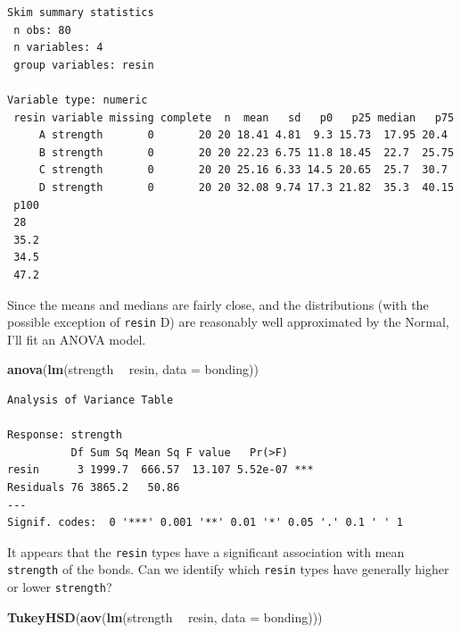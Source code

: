 \documentclass[]{book}
\newenvironment{Shaded}{\begin{snugshade}}{\end{snugshade}}
\newcommand{\KeywordTok}[1]{\textcolor[rgb]{0.13,0.29,0.53}{\textbf{#1}}}
\newcommand{\DataTypeTok}[1]{\textcolor[rgb]{0.13,0.29,0.53}{#1}}
\newcommand{\StringTok}[1]{\textcolor[rgb]{0.31,0.60,0.02}{#1}}
\newcommand{\OperatorTok}[1]{\textcolor[rgb]{0.81,0.36,0.00}{\textbf{#1}}}
\newcommand{\NormalTok}[1]{#1}
\theoremstyle{definition}
\theoremstyle{definition}
\theoremstyle{definition}
\theoremstyle{remark}
\begin{document}
\begin{Shaded}
\end{Shaded}

\begin{verbatim}
Skim summary statistics
 n obs: 80 
 n variables: 4 
 group variables: resin 

Variable type: numeric 
 resin variable missing complete  n  mean   sd   p0   p25 median   p75
     A strength       0       20 20 18.41 4.81  9.3 15.73  17.95 20.4 
     B strength       0       20 20 22.23 6.75 11.8 18.45  22.7  25.75
     C strength       0       20 20 25.16 6.33 14.5 20.65  25.7  30.7 
     D strength       0       20 20 32.08 9.74 17.3 21.82  35.3  40.15
 p100
 28  
 35.2
 34.5
 47.2
\end{verbatim}

Since the means and medians are fairly close, and the distributions
(with the possible exception of \texttt{resin} D) are reasonably well
approximated by the Normal, I'll fit an ANOVA model.

\begin{Shaded}
\begin{Highlighting}[]
\KeywordTok{anova}\NormalTok{(}\KeywordTok{lm}\NormalTok{(strength }\OperatorTok{~}\StringTok{ }\NormalTok{resin, }\DataTypeTok{data =}\NormalTok{ bonding))}
\end{Highlighting}
\end{Shaded}

\begin{verbatim}
Analysis of Variance Table

Response: strength
          Df Sum Sq Mean Sq F value   Pr(>F)    
resin      3 1999.7  666.57  13.107 5.52e-07 ***
Residuals 76 3865.2   50.86                     
---
Signif. codes:  0 '***' 0.001 '**' 0.01 '*' 0.05 '.' 0.1 ' ' 1
\end{verbatim}

It appears that the \texttt{resin} types have a significant association
with mean \texttt{strength} of the bonds. Can we identify which
\texttt{resin} types have generally higher or lower \texttt{strength}?

\begin{Shaded}
\begin{Highlighting}[]
\KeywordTok{TukeyHSD}\NormalTok{(}\KeywordTok{aov}\NormalTok{(}\KeywordTok{lm}\NormalTok{(strength }\OperatorTok{~}\StringTok{ }\NormalTok{resin, }\DataTypeTok{data =}\NormalTok{ bonding)))}
\end{Highlighting}
\end{Shaded}
\end{document}
